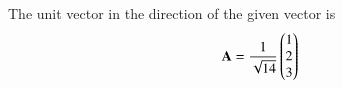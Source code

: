 The unit vector in the direction of the given vector is 
\begin{align}
	\mathbf{A} =\frac{1}{\sqrt{14}}\begin{pmatrix}1\\2\\3\end{pmatrix}
\end{align}
